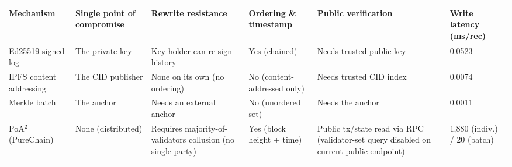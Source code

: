 \begin{tabular}{p{1.7cm}p{2.4cm}p{2.4cm}p{2.4cm}p{2.4cm}p{2.2cm}}
\toprule
Mechanism & Single point of compromise & Rewrite resistance & Ordering \& timestamp & Public verification & Write latency (ms/rec) \\
\midrule
Ed25519 signed log & The private key & Key holder can re-sign history & Yes (chained) & Needs trusted public key & 0.0523 \\
\addlinespace
IPFS content addressing & The CID publisher & None on its own (no ordering) & No (content-addressed only) & Needs trusted CID index & 0.0074 \\
\addlinespace
Merkle batch & The anchor & Needs an external anchor & No (unordered set) & Needs the anchor & 0.0011 \\
\addlinespace
PoA$^2$ (PureChain) & None (distributed) & Requires majority-of-validators collusion (no single party) & Yes (block height + time) & Public tx/state read via RPC (validator-set query disabled on current public endpoint) & 1,880 (indiv.) / 20 (batch) \\
\addlinespace
\bottomrule
\end{tabular}